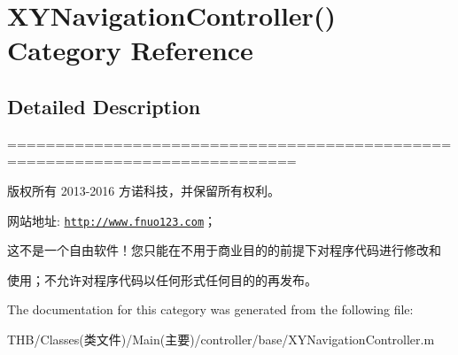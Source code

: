 \hypertarget{category_x_y_navigation_controller_07_08}{}\section{X\+Y\+Navigation\+Controller() Category Reference}
\label{category_x_y_navigation_controller_07_08}


\subsection{Detailed Description}
============================================================================

版权所有 2013-\/2016 方诺科技，并保留所有权利。

网站地址\+: \href{http://www.fnuo123.com}{\tt http\+://www.\+fnuo123.\+com}； 



这不是一个自由软件！您只能在不用于商业目的的前提下对程序代码进行修改和

使用；不允许对程序代码以任何形式任何目的的再发布。 

 

The documentation for this category was generated from the following file\+:\begin{DoxyCompactItemize}
\item 
T\+H\+B/\+Classes(类文件)/\+Main(主要)/controller/base/X\+Y\+Navigation\+Controller.\+m\end{DoxyCompactItemize}
